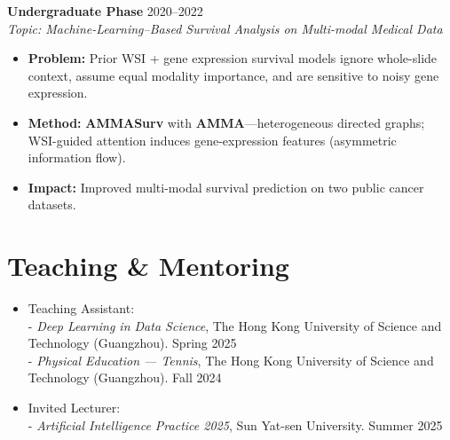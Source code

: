 \documentclass[letterpaper,10pt]{article}
\begin{document}
\begin{CJK}{UTF8}{gbsn}
\textbf{Undergraduate Phase} \hfill 2020--2022 \\
\emph{Topic: Machine-Learning–Based Survival Analysis on Multi-modal Medical Data}
\begin{itemize}
  \item \textbf{Problem:} Prior WSI + gene expression survival models ignore whole-slide context, assume equal modality importance, and are sensitive to noisy gene expression.
  \item \textbf{Method:} \textbf{AMMASurv} with \textbf{AMMA}---heterogeneous directed graphs; WSI-guided attention induces gene-expression features (asymmetric information flow).
  \item \textbf{Impact:} Improved multi-modal survival prediction on two public cancer datasets.
\end{itemize}



\section{\Large{Teaching \& Mentoring}}
\begin{itemize}
    \item  Teaching Assistant:  \\
    - \textit{Deep Learning in Data Science}, The Hong Kong University of Science and Technology (Guangzhou).   \hfill Spring 2025 \\
    \vspace{2pt}
    - \textit{Physical Education — Tennis}, The Hong Kong University of Science and Technology (Guangzhou). \hfill Fall 2024
    \item  Invited Lecturer: \\
    - \textit{Artificial Intelligence Practice 2025}, Sun Yat-sen University. \hfill Summer 2025
    
\end{itemize}




\end{CJK}
\end{document}
